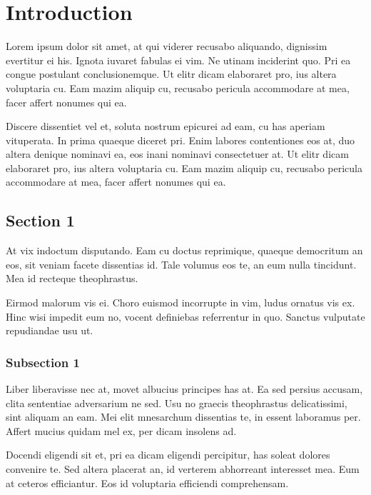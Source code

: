 \cleartooddpage[\thispagestyle{empty}]
\chapter{Introduction}\label{CHAPTER1}

Lorem ipsum dolor sit amet, at qui viderer recusabo aliquando, dignissim 
evertitur ei his. Ignota iuvaret fabulas ei vim. Ne utinam inciderint quo. 
Pri ea congue postulant conclusionemque. Ut elitr dicam elaboraret pro, ius 
altera voluptaria cu. Eam mazim aliquip cu, recusabo pericula accommodare at 
mea, facer affert nonumes qui ea.

Discere dissentiet vel et, soluta nostrum epicurei ad eam, cu has aperiam 
vituperata. In prima quaeque diceret pri. Enim labores contentiones eos at, 
duo altera denique nominavi ea, eos inani nominavi consectetuer at. Ut elitr 
dicam elaboraret pro, ius altera voluptaria cu. Eam mazim aliquip cu, 
recusabo pericula accommodare at mea, facer affert nonumes qui ea.
\cite{Crystal09_01,DMOL3_01,HPL_DGEMM_02}

\section{Section 1}\label{CHAPTER1_SECTION1}

At vix indoctum disputando. Eam cu doctus reprimique, quaeque democritum 
an eos, sit veniam facete dissentias id. Tale volumus eos te, an eum nulla 
tincidunt. Mea id recteque theophrastus.

Eirmod malorum vis ei. Choro euismod incorrupte in vim, ludus ornatus vis ex. 
Hinc wisi impedit eum no, vocent definiebas referrentur in quo. Sanctus 
vulputate repudiandae usu ut.

\subsection{Subsection 1}\label{CHAPTER1_SECTION1_SUBSECTION1}

Liber liberavisse nec at, movet albucius principes has at. Ea sed persius 
accusam, clita sententiae adversarium ne sed. Usu no graecis theophrastus 
delicatissimi, sint aliquam an eam. Mei elit mnesarchum dissentias te, in 
essent laboramus per. Affert mucius quidam mel ex, per dicam insolens ad.

Docendi eligendi sit et, pri ea dicam eligendi percipitur, has soleat 
dolores convenire te. Sed altera placerat an, id verterem abhorreant 
interesset mea. Eum at ceteros efficiantur. Eos id voluptaria efficiendi 
comprehensam. \cite{CPMD_01}

